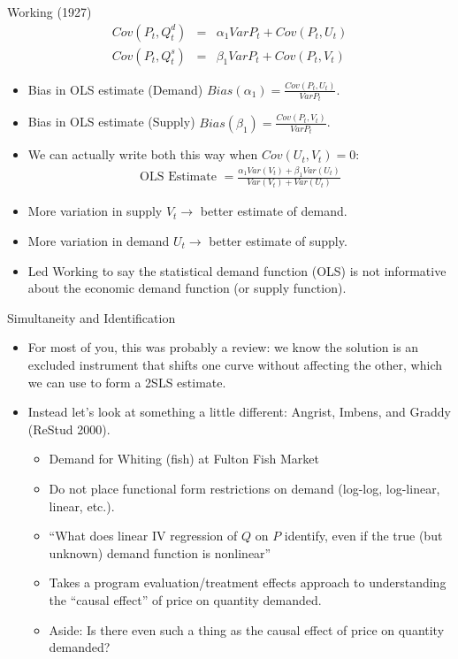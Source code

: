 \documentclass[aspectratio=169,11pt]{beamer}
\begin{document}
\begin{frame}{Working (1927)}
\small
\vspace{-0.2cm}
\begin{eqnarray*}
Cov(P_t, Q_t^d) &=& \alpha_1 Var P_t + Cov (P_t,U_t)\\
Cov(P_t, Q_t^s) &=& \beta_1 Var P_t + Cov (P_t,V_t)
\end{eqnarray*}
\vspace{-1cm}
\begin{itemize}
\item Bias in OLS estimate (Demand) $Bias(\alpha_1) = \frac{Cov(P_t,U_t)}{Var P_t}$.
\item Bias in OLS estimate (Supply) $Bias(\beta_1) = \frac{Cov(P_t,V_t)}{Var P_t}$.
\item We can actually write both this way when $Cov(U_t,V_t) = 0$:
\begin{eqnarray*}
\text{OLS Estimate }= \frac{\alpha_1 Var(V_t) + \beta_1 Var (U_t)}{Var (V_t) + Var (U_t)}
\end{eqnarray*}
\item More variation in supply $V_t \rightarrow$ better estimate of demand.
\item More variation in demand $U_t \rightarrow$ better estimate of supply.
\item Led Working to say the \alert{statistical demand function} (OLS) is not informative about the economic demand function (or supply function).
\end{itemize}
\end{frame}

\begin{frame}{Simultaneity and Identification}
\begin{itemize}
\item For most of you, this was probably a review: we know the solution is an \alert{excluded instrument} that shifts one curve without affecting the other, which we can use to form a 2SLS estimate.
\item Instead let's look at something a little different: Angrist, Imbens, and Graddy (ReStud 2000).
\begin{itemize}
\item Demand for Whiting (fish) at Fulton Fish Market
\item Do not place functional form restrictions on demand (log-log, log-linear, linear, etc.).
\item ``What does linear IV regression of $Q$ on $P$ identify, even if the true (but unknown) demand function is nonlinear''
\item Takes a program evaluation/treatment effects approach to understanding the ``causal effect'' of price on quantity demanded.
\item Aside: Is there even such a thing as the causal effect of price on quantity demanded?
\end{itemize}
\end{itemize}
\end{frame}
\end{document}
